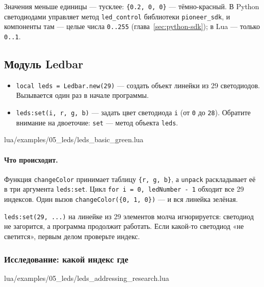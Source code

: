 Значения меньше единицы --- тусклее: \verb|{0.2, 0, 0}| --- тёмно-красный. В Python светодиодами управляет метод \verb|led_control| библиотеки \texttt{pioneer\_sdk}, и компоненты там --- целые числа \verb|0..255| (глава~\ref{sec:python-sdk}); в Lua --- только \verb|0..1|.

\subsection{Модуль Ledbar}

\begin{codebox}
\begin{itemize}
  \item \verb|local leds = Ledbar.new(29)| --- создать объект линейки из 29 светодиодов. Вызывается один раз в начале программы.
  \item \verb|leds:set(i, r, g, b)| --- задать цвет светодиода \verb|i| (от \verb|0| до \verb|28|). Обратите внимание на двоеточие: \verb|set| --- метод объекта \verb|leds|.
\end{itemize}
\end{codebox}

\begin{codefile}{lua/examples/05_leds/leds_basic_green.lua}
\end{codefile}

\paragraph{Что происходит.} Функция \verb|changeColor| принимает таблицу \verb|{r, g, b}|, а \verb|unpack| раскладывает её в три аргумента \verb|leds:set|. Цикл \verb|for i = 0, ledNumber - 1| обходит все 29 индексов. Один вызов \verb|changeColor({0, 1, 0})| --- и вся линейка зелёная.

\begin{warnbox}
\verb|leds:set(29, ...)| на линейке из 29 элементов молча игнорируется: светодиод не загорится, а программа продолжит работать. Если какой-то светодиод «не светится», первым делом проверьте индекс.
\end{warnbox}

\subsubsection*{Исследование: какой индекс где}

\begin{codefile}{lua/examples/05_leds/leds_addressing_research.lua}
\end{codefile}

